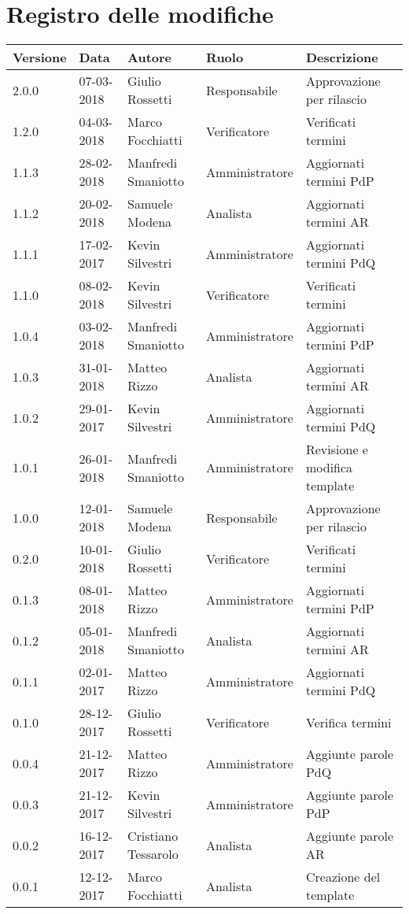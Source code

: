 \documentclass[./AnalisideiRequisiti.tex]{subfiles}
\begin{document}
	
{
	\chapter*{Registro delle modifiche}
\setlength\LTleft{-22mm}
	\begin{longtable}{|p{20mm}|p{20mm}|p{40mm}|p{30mm}|p{50mm}|}
		\hline
		\textbf{Versione} & \textbf{Data} & \textbf{Autore} & \textbf{Ruolo} & \textbf{Descrizione} \\ \hline 
		2.0.0 & 07-03-2018 & Giulio Rossetti & Responsabile & Approvazione per rilascio\\ \hline
		1.2.0 & 04-03-2018 & Marco Focchiatti & Verificatore & Verificati termini\\ \hline
		
		1.1.3 & 28-02-2018 & Manfredi Smaniotto & Amministratore & Aggiornati termini PdP\\ \hline
		1.1.2 & 20-02-2018 & Samuele Modena & Analista & Aggiornati termini AR \\ \hline		
		1.1.1 & 17-02-2017 & Kevin Silvestri & Amministratore & Aggiornati termini PdQ\\
		\hline
		1.1.0 & 08-02-2018 & Kevin Silvestri & Verificatore & Verificati termini\\ \hline
		
		1.0.4 & 03-02-2018 & Manfredi Smaniotto & Amministratore & Aggiornati termini PdP\\ \hline
		1.0.3 & 31-01-2018 & Matteo Rizzo & Analista & Aggiornati termini AR \\ \hline		
		1.0.2 & 29-01-2017 & Kevin Silvestri & Amministratore & Aggiornati termini PdQ\\ \hline 
		1.0.1 & 26-01-2018 & Manfredi Smaniotto & Amministratore & Revisione e modifica template\\ \hline
		1.0.0 & 12-01-2018 & Samuele Modena & Responsabile & Approvazione per rilascio\\ \hline
		0.2.0 & 10-01-2018 & Giulio Rossetti & Verificatore & Verificati termini\\ \hline
	
		0.1.3 & 08-01-2018 & Matteo Rizzo & Amministratore & Aggiornati termini PdP\\ \hline
		0.1.2 & 05-01-2018 & Manfredi Smaniotto & Analista & Aggiornati termini AR \\ \hline		
		0.1.1 & 02-01-2017 & Matteo Rizzo & Amministratore & Aggiornati termini PdQ\\ \hline	
	   	0.1.0 & 28-12-2017 & Giulio Rossetti & Verificatore & Verifica termini\\ \hline		
		0.0.4 & 21-12-2017 & Matteo Rizzo & Amministratore & Aggiunte parole PdQ \\ \hline
		0.0.3 & 21-12-2017 & Kevin Silvestri & Amministratore & Aggiunte parole PdP \\ \hline
		0.0.2 & 16-12-2017 & Cristiano Tessarolo & Analista & Aggiunte parole AR\\ \hline
		0.0.1 & 12-12-2017 & Marco Focchiatti & Analista & Creazione del template\\ \hline
	\end{longtable}

}	
\end{document}
